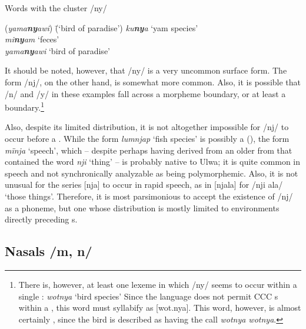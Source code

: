 \ea%
    \label{ex:phon:21}
          Words with the cluster /ny/\\
\begin{tabbing}
{(\textit{yama\textbf{ny}awi})} \= {(‘bird of paradise’)}\kill
{\textit{ku\textbf{ny}a}} \> {‘yam species’}\\
{\textit{mi\textbf{ny}am}} \> {‘feces’}\\
{\textit{yama\textbf{ny}awi}} \> {‘bird of paradise’}
\end{tabbing}
\z

It should be noted, however, that /ny/ is a very uncommon surface form. The form /nj/, on the other hand, is somewhat more common. Also, it is possible that /n/ and /y/ in these examples fall across a morpheme boundary, or at least a  boundary.\footnote{There is, however, at least one lexeme in which /ny/ seems to occur within a single : \textit{wotnya} ‘bird species’ Since the language does not permit CCC s within a , this word must syllabify as [wot.nya]. This word, however, is almost certainly , since the bird is described as having the call \textit{wotnya wotnya}.}

  Also, despite its limited distribution, it is not altogether impossible for /nj/ to occur before a . While the form \textit{lumnjap} ‘fish species’ is possibly a  (), the form \textit{mïnja} ‘speech’, which -- despite perhaps having derived from an older from that contained the word \textit{nji} ‘thing’ -- is probably native to Ulwa; it is quite common in speech and not synchronically analyzable as being polymorphemic. Also, it is not unusual for the series [nja] to occur in rapid speech, as in [njala] for /nji ala/ ‘those things’. Therefore, it is most parsimonious to accept the existence of /nj/ as a phoneme, but one whose distribution is mostly limited to environments directly preceding s.




\subsection{Nasals /m, n/}\label{sec:2.1.4}


